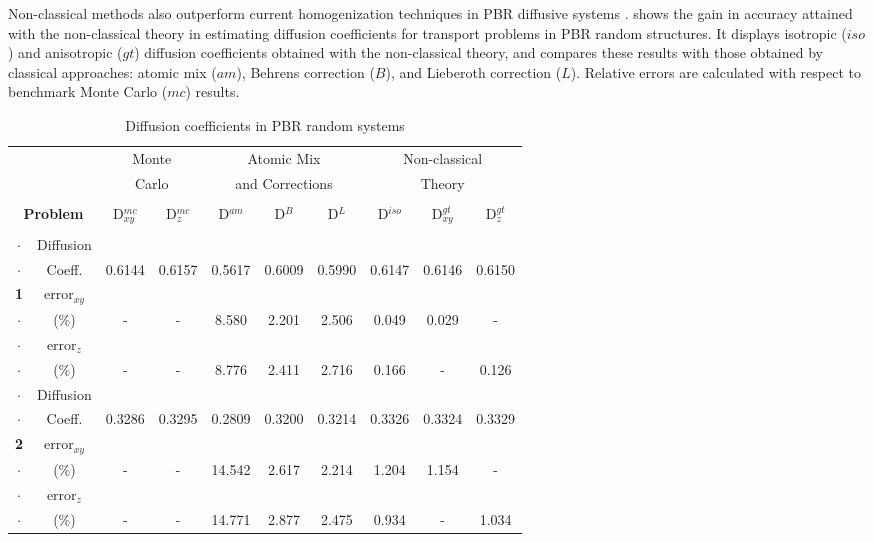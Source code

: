 \documentclass[12pt]{article}
\begin{document}
Non-classical methods also outperform current homogenization techniques in PBR diffusive systems \cite{larvas11,vaslar14b,vas13}.
 shows the gain in accuracy attained with the non-classical theory in estimating diffusion coefficients for transport problems in PBR random structures.
It displays isotropic ($iso$) and anisotropic ($gt$) diffusion coefficients obtained with the non-classical theory, and compares these results with those obtained by classical approaches: atomic mix ($am$), Behrens correction ($B$), and Lieberoth correction ($L$).
Relative errors are calculated with respect to benchmark Monte Carlo ($mc$) results.
\begin{table}[!ht]
\small
\centering
\caption{Diffusion coefficients in PBR random systems \cite{vaslar14b}}\label{tab1}
\begin{tabular}{||cc||c|c||c|c|c||c||c|c||}\hline\hline
&& \multicolumn{2}{c||}{Monte} & \multicolumn{3}{c||}{Atomic Mix} & \multicolumn{3}{c||}{Non-classical}\\
&& \multicolumn{2}{c||}{Carlo} & \multicolumn{3}{c||}{and Corrections} & \multicolumn{3}{c||}{Theory}\\
\cline{3-10}
&&&&&&&&&\\
\multicolumn{2}{||c||}{{\bf Problem}} &D$_{xy}^{mc}$&D$_z^{mc}$&D$^{am}$&D$^{B}$&D$^{L}$ & D$^{iso}$  &D$_{xy}^{gt}$ & D$_z^{gt}$\\
&&&&&&&&&\\
\hline\hline
\multicolumn{1}{||c|}{$\mathbf{\cdot}$}&{\footnotesize Diffusion} &&&&&&&&\\
\multicolumn{1}{||c|}{$\mathbf{\cdot}$} &{\footnotesize Coeff.}&
0.6144
&0.6157
&0.5617
&0.6009
&0.5990
&0.6147
&0.6146
&0.6150\\
\cline{2-10}
\multicolumn{1}{||c|}{{\bf 1}} &{\footnotesize error$_{xy}$} &&&&&&&&\\
\multicolumn{1}{||c|}{$\mathbf{\cdot}$} &{\footnotesize (\%)} &
-
& -
&8.580
&2.201
&2.506
&0.049
&0.029
& -\\
\cline{2-10}
\multicolumn{1}{||c|}{$\mathbf{\cdot}$} &{\footnotesize error$_z$} &&&&&&&&\\
\multicolumn{1}{||c|}{$\mathbf{\cdot}$} &{\footnotesize (\%)} &
-
& -
&8.776
&2.411
&2.716
&0.166
& -
&0.126
\\
\hline
\hline
\multicolumn{1}{||c|}{$\mathbf{\cdot}$}&{\footnotesize Diffusion} &&&&&&&&\\
\multicolumn{1}{||c|}{$\mathbf{\cdot}$} &{\footnotesize Coeff.}
&0.3286
&0.3295
&0.2809
&0.3200
&0.3214
&0.3326
&0.3324
&0.3329\\
\cline{2-10}
\multicolumn{1}{||c|}{{\bf 2}} &{\footnotesize error$_{xy}$} &&&&&&&&\\
\multicolumn{1}{||c|}{$\mathbf{\cdot}$} &{\footnotesize (\%)} &
-
& -
&14.542
&2.617
&2.214
&1.204
&1.154
& -\\
\cline{2-10}
\multicolumn{1}{||c|}{$\mathbf{\cdot}$} &{\footnotesize error$_z$} &&&&&&&&\\
\multicolumn{1}{||c|}{$\mathbf{\cdot}$} &{\footnotesize (\%)} &
-
& -
&14.771
&2.877
&2.475
&0.934
& -
&1.034
\\
\hline
\hline
\end{tabular}
\end{table}
\end{document}
